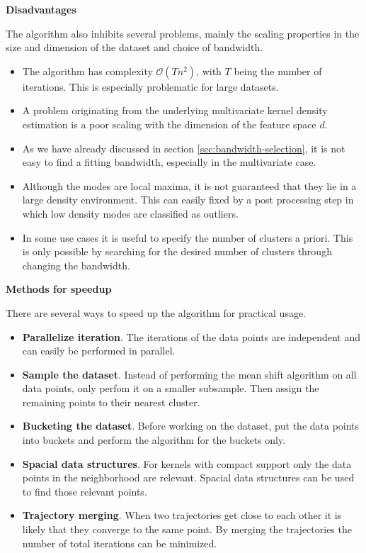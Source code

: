 \documentclass{article}
\begin{document}
\textbf{Disadvantages}

The algorithm also inhibits several problems, mainly the scaling properties in the size and dimension of the dataset and choice of bandwidth.

\begin{itemize}
	\item The algorithm has complexity $\mathcal{O}(Tn^2)$, with $T$ being the number of iterations. This is especially problematic for large datasets.
	
	\item A problem originating from the underlying multivariate kernel density estimation is a poor scaling with the dimension of the feature space $d$.
	
	\item As we have already discussed in section \ref{sec:bandwidth-selection}, it is not easy to find a fitting bandwidth, especially in the multivariate case.
	
	\item Although the modes are local maxima, it is not guaranteed that they lie in a large density environment. This can easily fixed by a post processing step in which low density modes are classified as outliers.
	
	\item In some use cases it is useful to specify the number of clusters a priori. This is only possible by searching for the desired number of clusters through changing the bandwidth.
\end{itemize}

\textbf{Methods for speedup}

There are several ways to speed up the algorithm for practical usage.
\begin{itemize}
	\item \textbf{Parallelize iteration}. The iterations of the data points are independent and can easily be performed in parallel.
	
	\item \textbf{Sample the dataset}. Instead of performing the mean shift algorithm on all data points, only perfom it on a smaller subsample. Then assign the remaining points to their nearest cluster.
	
	\item \textbf{Bucketing the dataset}. Before working on the dataset, put the data points into buckets and perform the algorithm for the buckets only.
	
	\item \textbf{Spacial data structures}. For kernels with compact support only the data points in the neighborhood are relevant. Spacial data structures can be used to find those relevant points.
	
	\item \textbf{Trajectory merging}. When two trajectories get close to each other it is likely that they converge to the same point. By merging the trajectories the number of total iterations can be minimized.
\end{itemize}
\end{document}
